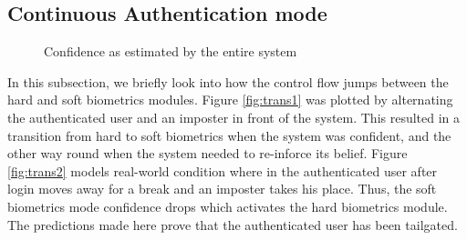 \documentclass[%
        final,
        notitlepage,
        narroweqnarray,
        inline,
        ]{ieee}
\begin{document}
\subsection{Continuous Authentication mode}
\begin{figure}
	\centering
	\quad
	\caption{Confidence as estimated by the entire system}
\end{figure}
In this subsection, we briefly look into how the control flow jumps between the hard and soft biometrics modules.
Figure \ref{fig:trans1} was plotted by alternating the authenticated user and an imposter in front of the system.
This resulted in a transition from hard to soft biometrics when the system was confident, and the other way round when the system needed to re-inforce its belief.
Figure \ref{fig:trans2} models real-world condition where in the authenticated user after login moves away for a break and an imposter takes his place.
Thus, the soft biometrics mode confidence drops which activates the hard biometrics module.
The predictions made here prove that the authenticated user has been tailgated.
\end{document}
